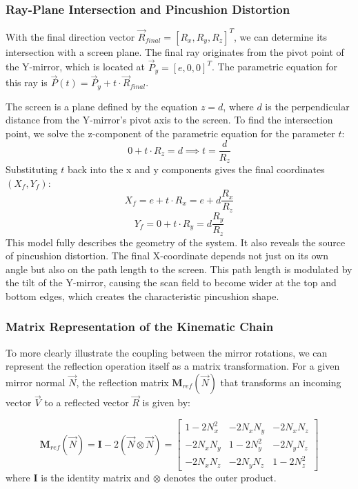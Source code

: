 \documentclass[12pt]{article}
\begin{document}
\subsubsection{Ray-Plane Intersection and Pincushion Distortion}
With the final direction vector \(\vec{R}_{final} = [R_x, R_y, R_z]^T\), we can determine its intersection with a screen plane. The final ray originates from the pivot point of the Y-mirror, which is located at \(\vec{P}_y = [e, 0, 0]^T\). The parametric equation for this ray is \(\vec{P}(t) = \vec{P}_y + t \cdot \vec{R}_{final}\).

The screen is a plane defined by the equation \(z=d\), where \(d\) is the perpendicular distance from the Y-mirror's pivot axis to the screen. To find the intersection point, we solve the z-component of the parametric equation for the parameter \(t\):
\begin{equation}
0 + t \cdot R_z = d \implies t = \frac{d}{R_z}
\end{equation}
Substituting \(t\) back into the x and y components gives the final coordinates \((X_f, Y_f)\):
\begin{equation}
X_f = e + t \cdot R_x = e + d \frac{R_x}{R_z}
\end{equation}
\begin{equation}
Y_f = 0 + t \cdot R_y = d \frac{R_y}{R_z}
\end{equation}
This model fully describes the geometry of the system. It also reveals the source of pincushion distortion. The final X-coordinate depends not just on its own angle but also on the path length to the screen. This path length is modulated by the tilt of the Y-mirror, causing the scan field to become wider at the top and bottom edges, which creates the characteristic pincushion shape.

\subsubsection{Matrix Representation of the Kinematic Chain}

To more clearly illustrate the coupling between the mirror rotations, we can represent the reflection operation itself as a matrix transformation. For a given mirror normal \(\vec{N}\), the reflection matrix \(\mathbf{M}_{ref}(\vec{N})\) that transforms an incoming vector \(\vec{V}\) to a reflected vector \(\vec{R}\) is given by:

\begin{equation}
\mathbf{M}_{ref}(\vec{N}) = \mathbf{I} - 2(\vec{N} \otimes \vec{N}) = \begin{bmatrix} 1 - 2N_x^2 & -2N_xN_y & -2N_xN_z \\ -2N_xN_y & 1 - 2N_y^2 & -2N_yN_z \\ -2N_xN_z & -2N_yN_z & 1 - 2N_z^2 \end{bmatrix}
\end{equation}
where \(\mathbf{I}\) is the identity matrix and \(\otimes\) denotes the outer product.
\end{document}
